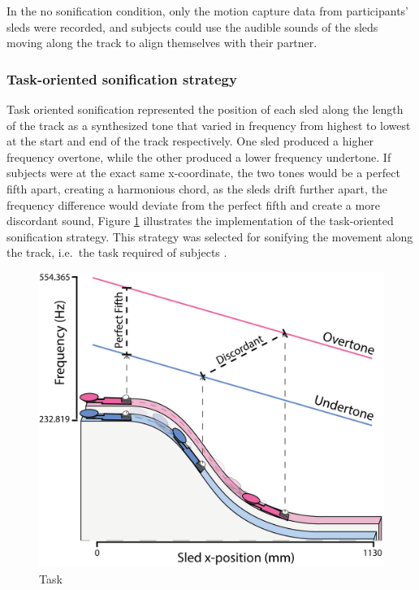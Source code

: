 \documentclass[10pt,a4paper,onecolumn]{article}
\begin{document}
In the no sonification condition, only the motion capture data from participants' sleds were recorded, and subjects could use the audible sounds of the sleds moving along the track to align themselves with their partner.

\hypertarget{task-oriented-sonification-strategy}{%
\subsubsection{Task-oriented sonification strategy}\label{task-oriented-sonification-strategy}}

Task oriented sonification represented the position of each sled along the length of the track as a synthesized tone that varied in frequency from highest to lowest at the start and end of the track respectively. One sled produced a higher frequency overtone, while the other produced a lower frequency undertone. If subjects were at the exact same x-coordinate, the two tones would be a perfect fifth apart, creating a harmonious chord, as the sleds drift further apart, the frequency difference would deviate from the perfect fifth and create a more discordant sound, Figure \ref{fig:task-illustration} illustrates the implementation of the task-oriented sonification strategy. This strategy was selected for sonifying the movement along the track, i.e.~the task required of subjects .

\begin{figure}

{\centering \includegraphics[width=1\linewidth]{figures/task_sonif_illustration} 

}

\caption{Task}\label{fig:task-illustration}
\end{figure}
\end{document}
